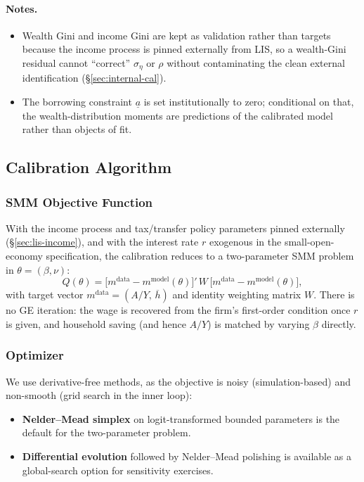 \paragraph{Notes.}
\begin{itemize}[leftmargin=*]
    \item Wealth Gini and income Gini are kept as validation rather than targets because the income process is pinned externally from LIS, so a wealth-Gini residual cannot ``correct'' $\sigma_\eta$ or $\rho$ without contaminating the clean external identification (\S\ref{sec:internal-cal}).
    \item The borrowing constraint $\underline{a}$ is set institutionally to zero; conditional on that, the wealth-distribution moments are predictions of the calibrated model rather than objects of fit.
\end{itemize}

\subsection{Calibration Algorithm}

\subsubsection{SMM Objective Function}

With the income process and tax/transfer policy parameters pinned externally (\S\ref{sec:lis-income}), and with the interest rate $r$ exogenous in the small-open-economy specification, the calibration reduces to a two-parameter SMM problem in $\theta = (\beta, \nu)$:
\begin{equation}\label{eq:smm-objective}
Q(\theta) = \big[m^{\text{data}} - m^{\text{model}}(\theta)\big]'\, W\, \big[m^{\text{data}} - m^{\text{model}}(\theta)\big],
\end{equation}
with target vector $m^{\text{data}} = (A/Y,\, \overline{h})$ and identity weighting matrix $W$. There is no GE iteration: the wage is recovered from the firm's first-order condition once $r$ is given, and household saving (and hence $A/Y$) is matched by varying $\beta$ directly.

\subsubsection{Optimizer}

We use derivative-free methods, as the objective is noisy (simulation-based) and non-smooth (grid search in the inner loop):
\begin{itemize}[leftmargin=*]
    \item \textbf{Nelder--Mead simplex} on logit-transformed bounded parameters is the default for the two-parameter problem.
    \item \textbf{Differential evolution} followed by Nelder--Mead polishing is available as a global-search option for sensitivity exercises.
\end{itemize}

